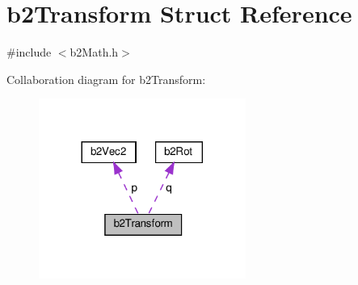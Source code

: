 \hypertarget{structb2Transform}{}\section{b2\+Transform Struct Reference}
\label{structb2Transform}


{\ttfamily \#include $<$b2\+Math.\+h$>$}



Collaboration diagram for b2\+Transform\+:
\nopagebreak
\begin{figure}[H]
\begin{center}
\leavevmode
\includegraphics[width=192pt]{structb2Transform__coll__graph}
\end{center}
\end{figure}
